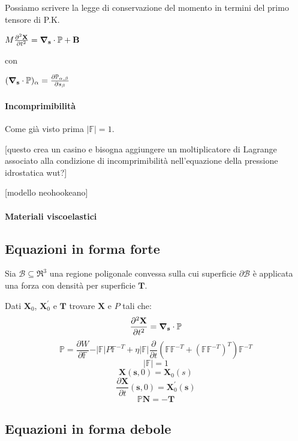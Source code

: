 Possiamo scrivere la legge di conservazione del momento in termini del primo tensore di P.K.

$M\frac{\partial^2\mathbf{X}}{\partial t^2} = \boldsymbol{\nabla}_\mathbf{s} \cdot \mathbb{P} + \mathbf{B}$

con 

$(\boldsymbol{\nabla}_\mathbf{s} \cdot \mathbb{P} )_{\alpha} = \frac{\partial\mathbb{P}_{\alpha,\beta}}{\partial s_\beta}$

\paragraph{Incomprimibilità}

Come già visto prima $\vert \mathbb{F} \vert = 1$.

[questo crea un casino e bisogna aggiungere un moltiplicatore di Lagrange associato alla condizione di incomprimibilità nell'equazione della pressione idrostatica wut?]

[modello neohookeano]

\paragraph{Materiali viscoelastici}

\subsection{Equazioni in forma forte}

Sia $\mathcal{B} \subseteq \Re^3$ una regione poligonale convessa sulla cui superficie $\partial\mathcal{B}$ è applicata una forza con densità per superficie $\mathbf{T}$.

Dati $\mathbf{X}_0$, $\mathbf{X}^{'}_0$ e $\mathbf{T}$ trovare $\mathbf{X}$ e $P$ tali che:
$$\frac{\partial^2\mathbf{X}}{\partial t^2} = \boldsymbol{\nabla}_\mathbf{s} \cdot \mathbb{P}$$
$$\mathbb{P} = \frac{\partial W}{\partial\mathbb{F}} - \vert\mathbb{F}\vert P\mathbb{F}^{-T} + \eta\vert\mathbb{F}\vert \frac{\partial}{\partial t}(\mathbb{F}\mathbb{F}^{-T} + (\mathbb{F}\mathbb{F}^{-T})^T)\mathbb{F}^{-T}$$
$$\vert\mathbb{F}\vert=1$$
$$\mathbf{X}(\mathbf{s},0)=\mathbf{X}_0(s)$$
$$\frac{\partial \mathbf{X}}{\partial t}(\mathbf{s},0)=\mathbf{X}^{'}_0(\mathbf{s})$$
$$\mathbb{P}\mathbf{N}=-\mathbf{T}$$

\subsection{Equazioni in forma debole}

